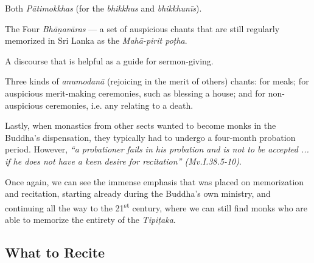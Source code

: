 \fi

\ifbfive

\begin{packeditemize}
  \item Both \textit{Pātimokkhas} (for the \textit{bhikkhus} and \textit{bhikkhunīs}).
  \item The Four \textit{Bhāṇavāras} — a set of auspicious chants that are still regularly memorized in Sri Lanka as the \textit{Mahā-pirit poṭha}.
  \item A discourse that is helpful as a guide for sermon-giving.
  \clearpage
  \item Three kinds of \textit{anumodanā} (rejoicing in the merit of others) chants: for meals; for auspicious merit-making ceremonies, such as blessing a house; and for non-auspicious ceremonies, i.e. any relating to a death.
\end{packeditemize}

\fi

Lastly, when monastics from other sects wanted to become monks in the Buddha's dispensation, they typically had to undergo a four-month probation period. However, \textit{``a probationer fails in his probation and is not to be accepted ... if he does not have a keen desire for recitation'' (Mv.I.38.5-10)}.

Once again, we can see the immense emphasis that was placed on memorization and recitation, starting already during the Buddha's own ministry, and continuing all the way to the 21\textsuperscript{st} century, where we can still find monks who are able to memorize the entirety of the \textit{Tipiṭaka}.

\subsection*{What to Recite}

\ifbfive\enlargethispage{1\baselineskip}\fi

